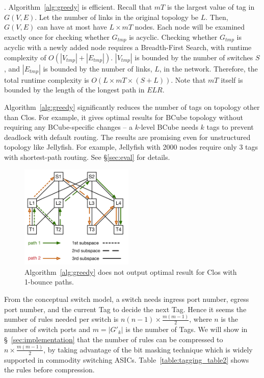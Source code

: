 . Algorithm~\ref{alg:greedy} is efficient. Recall that
$mT$ is the largest value of tag in $G(V,E)$. Let the number of links in the
original topology be $L$. Then, $G(V,E)$ can have at most have $L \times mT$
nodes.  Each node will be examined exactly once for checking whether $G_{tmp}$
is acyclic.  Checking whether $G_{tmp}$ is acyclic with a newly added node
requires a Breadth-First Search, with runtime complexity of $O(|V_{tmp}| +
|E_{tmp}|)$. $|V_{tmp}|$ is bounded by the number of switches $S$, and
$|E_{tmp}|$ is bounded by the number of links, $L$, in the network.  Therefore,
the total runtime complexity is $O(L \times mT \times (S+L))$. Note that $mT$
itself is bounded by the length of the longest path in $ELR$.

 Algorithm~\ref{alg:greedy} significantly reduces the
number of tags on topology other than Clos. For example, it gives optimal
results for BCube topology without requiring any BCube-specific changes -- a
$k$-level BCube needs $k$ tags to prevent deadlock with default routing. The
results are promising even for unstructured topology like Jellyfish.  For
example, Jellyfish with 2000 nodes require only 3 tags with shortest-path
routing. See \S\ref{sec:eval} for details.

\begin{figure}[t]
	\centering
	\includegraphics[width=0.48\textwidth] {figs/nonoptimal_example}
	\caption{Algorithm~\ref{alg:greedy} does not output optimal result for Clos with 1-bounce paths.}
	\label{fig:nonoptimal}
	\vspace{-1em}
\end{figure}

 From the conceptual switch model, a switch needs ingress
port number, egress port number, and the current Tag to decide the next Tag.
Hence it seems the number of rules needed per switch is $n(n-1)\times
\frac{m(m-1)}{2}$, where $n$ is the number of switch ports and $m=|G'_{k}|$ is
the number of Tags. We will show in \S~\ref{sec:implementation} that the number
of rules can be compressed to  $n\times \frac{m(m-1)}{2}$, by taking advantage
of the bit masking technique which is widely supported in commodity switching
ASICs. Table~\ref{table:tagging_table2} shows the rules before compression.

